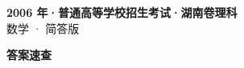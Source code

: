 \documentclass[zihao=-4, a4paper]{ctexart}
\begin{document}
\begin{center}
  {\Large\bfseries 2006 年·普通高等学校招生考试·湖南卷理科}\\[4pt]
  {\large 数学 · 简答版}
\end{center}
\medskip
{}

\clearpage
{}
\begin{center}{\Large\bfseries 答案速查}\end{center}
\medskip

\end{document}
